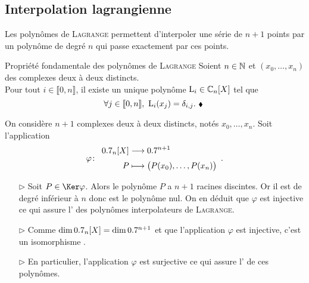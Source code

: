 \subsection{Interpolation lagrangienne}

Les polynômes de \textsc{Lagrange} permettent d'interpoler une série de $n+1$ points par un polynôme de degré $n$ qui passe exactement par ces points.

\begin{theo}{Propriété fondamentale des polynômes de \textsc{Lagrange}}
    Soient $n \in \mathbb{N}$ et $(x_0, \dots, x_n)$ des complexes deux à deux distincts. \\
    Pour tout $i \in \llbracket 0, n \rrbracket$, il existe un unique polynôme $\mathrm{L}_i \in \mathbb{C}_n[X]$ tel que 
    \begin{equation} \label{prop_fondamentale}
        \forall j \in \llbracket 0, n \rrbracket,\ \mathrm{L}_i(x_j) = \delta_{i,j}.\ \hbox{\scriptsize $\blacklozenge$\ }
    \end{equation}
\end{theo}


\begin{preuve}
    On considère $n + 1$ complexes deux à deux distincts, notés $x_0, \dots, x_n$. Soit l'application
    $$
    \fonction[\varphi]{\R_n[X]}{\R^{n+1}}{P}{\big(P(x_0), \dots, P(x_n) \big)}.
    $$
    \begin{itemize}
        \item[$\rhd$] Soit $P \in \Ker \varphi$. Alors le polynôme $P$ a $n+1$ racines discintes. Or il est de degré inférieur à $n$ donc est le polynôme nul. On en déduit que $\varphi$ est injective ce qui assure l' des polynômes interpolateurs de \textsc{Lagrange}.
        \item[$\rhd$] Comme $\dim 0.7_n[X] = \dim 0.7^{n+1}$ et que l'application $\varphi$ est injective, c'est un isomorphisme \note.
        \item[$\rhd$] En particulier, l'application $\varphi$ est surjective ce qui assure l' de ces polynômes. 
    \end{itemize}
\end{preuve}

